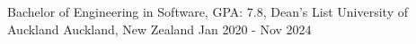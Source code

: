 
\begin{cventries}
  \cventry
    {Bachelor of Engineering in Software, GPA: 7.8, Dean's List} %
    {University of Auckland} %
    {Auckland, New Zealand} %
    {Jan 2020 - Nov 2024} %
    \item{}
    \vspace{-15mm}

\end{cventries}
